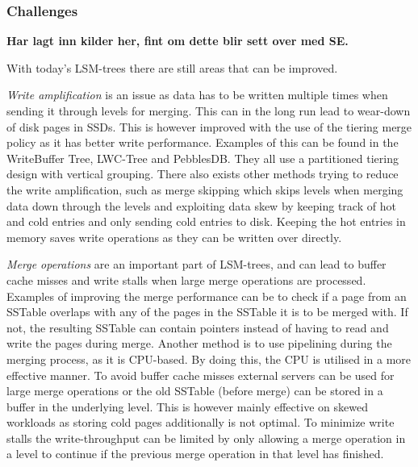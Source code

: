 \subsubsection{Challenges}
\textbf{Har lagt inn kilder her, fint om dette blir sett over med SE.}

With today's LSM-trees there are still areas that can be improved. \newline

\emph{Write amplification} is an issue as data has to be written multiple times when sending it through levels for merging. This can in the long run lead to wear-down of disk pages in SSDs. This is however improved with the use of the tiering merge policy as it has better write performance. Examples of this can be found in the WriteBuffer Tree\cite{WBTree}, LWC-Tree\cite{LWCTree1}\cite{LWCTree2} and PebblesDB\cite{PebblesDB}. They all use a partitioned tiering design with vertical grouping. There also exists other methods trying to reduce the write amplification, such as merge skipping which skips levels when merging data down through the levels\cite{SkipTree} and exploiting data skew by keeping track of hot and cold entries and only sending cold entries to disk\cite{TRIAD}. Keeping the hot entries in memory saves write operations as they can be written over directly. \newline

\emph{Merge operations} are an important part of LSM-trees, and can lead to buffer cache misses and write stalls when large merge operations are processed. Examples of improving the merge performance can be to check if a page from an SSTable overlaps with any of the pages in the SSTable it is to be merged with. If not, the resulting SSTable can contain pointers instead of having to read and write the pages during merge\cite{VTTree}. Another method is to use pipelining during the merging process, as it is CPU-based. By doing this, the CPU is utilised in a more effective manner\cite{ZhangEtAl}. To avoid buffer cache misses external servers\cite{AhmadEtAl} can be used for large merge operations or the old SSTable (before merge) can be stored in a buffer in the underlying level\cite{LSbMTree1}\cite{LSbMTree2}. This is however mainly effective on skewed workloads as storing cold pages additionally is not optimal. To minimize write stalls the write-throughput can be limited by only allowing a merge operation in a level to continue if the previous merge operation in that level has finished\cite{bLSM}. \newline

